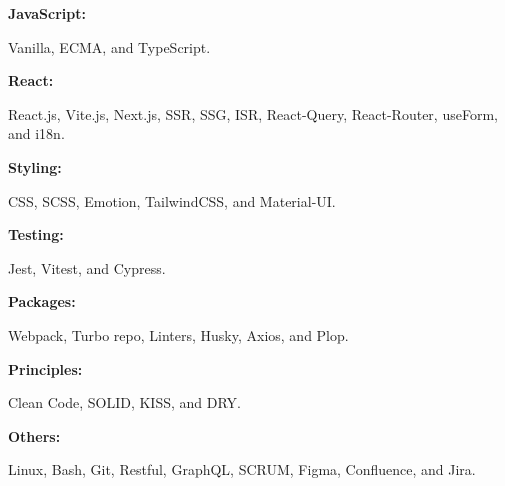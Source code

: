 \begin{minipage}[t]{0.47\textwidth}
    \vspace{-6pt}

    \begin{minipage}[t]{0.14\textwidth}
        \textbf{JavaScript:}
    \end{minipage}
    \hfill
    \begin{minipage}[t]{0.79\textwidth}
        Vanilla, ECMA, and TypeScript.
    \end{minipage}
    \vspace{4pt}

    \begin{minipage}[t]{0.14\textwidth}
        \textbf{React:}
    \end{minipage}
    \hfill
    \begin{minipage}[t]{0.79\textwidth}
        React.js, Vite.js, Next.js, SSR, SSG, ISR, React-Query, React-Router, useForm, and i18n.
    \end{minipage}
    \vspace{4pt}

    \begin{minipage}[t]{0.14\textwidth}
        \textbf{Styling:}
    \end{minipage}
    \hfill
    \begin{minipage}[t]{0.79\textwidth}
        CSS, SCSS, Emotion, TailwindCSS, and Material-UI.
    \end{minipage}
    \vspace{4pt}

    \begin{minipage}[t]{0.14\textwidth}
        \textbf{Testing:}
    \end{minipage}
    \hfill
    \begin{minipage}[t]{0.79\textwidth}
        Jest, Vitest, and Cypress.
    \end{minipage}
    \vspace{4pt}

    \begin{minipage}[t]{0.14\textwidth}
        \textbf{Packages:}
    \end{minipage}
    \hfill
    \begin{minipage}[t]{0.79\textwidth}
        Webpack, Turbo repo, Linters, Husky, Axios, and Plop.
    \end{minipage}
    \vspace{4pt}

    \begin{minipage}[t]{0.14\textwidth}
        \textbf{Principles:}
    \end{minipage}
    \hfill
    \begin{minipage}[t]{0.79\textwidth}
        Clean Code, SOLID, KISS, and DRY\@.
    \end{minipage}
    \vspace{4pt}

    \begin{minipage}[t]{0.14\textwidth}
        \textbf{Others:}
    \end{minipage}
    \hfill
    \begin{minipage}[t]{0.79\textwidth}
        Linux, Bash, Git, Restful, GraphQL, SCRUM, Figma, Confluence, and Jira.
    \end{minipage}
    \vspace{4pt}

\end{minipage}
